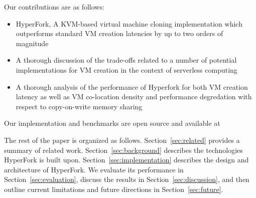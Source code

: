  Our contributions are as follows:
\begin{itemize}
\item HyperFork, A KVM-based virtual machine cloning implementation which outperforms
standard VM creation latencies by up to two orders of magnitude
\item A thorough discussion of the trade-offs related to a number of potential
implementations for VM creation in the context of serverless computing %
\item A thorough analysis of the performance of Hyperfork for both VM creation
latency as well as VM co-location density and performance degredation with
respect to copy-on-write memory sharing %
\end{itemize}

Our implementation and benchmarks are open source and available at %

The rest of the paper is organized as follows. Section~\ref{sec:related} provides a summary of related work. Section~\ref{sec:background} describes the technologies HyperFork is built upon. Section~\ref{sec:implementation} describes the design and architecture of HyperFork. We evaluate its performance in Section~\ref{sec:evaluation}, discuss the results in Section~\ref{sec:discussion}, and then outline current limitations and future directions in Section~\ref{sec:future}.
